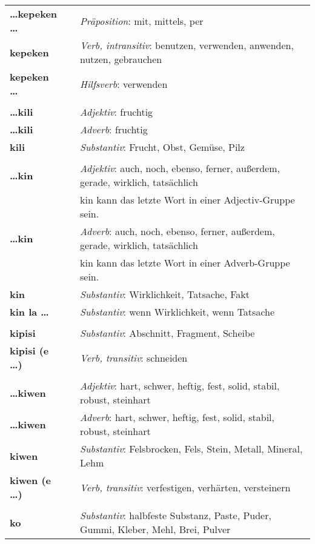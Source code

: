 \begin{supertabular}{p{2,5cm}|ll}
\textbf{\dots kepeken \dots} && \textit{Präposition}: mit, mittels, per \\ 
\textbf{kepeken} && \textit{Verb, intransitiv}: benutzen, verwenden, anwenden, nutzen, gebrauchen \\ 
\textbf{kepeken \dots} && \textit{Hilfsverb}: verwenden \\ 
 && \\ %
\textbf{\dots kili} && \textit{Adjektiv}: fruchtig \\ 
\textbf{\dots kili} && \textit{Adverb}: fruchtig \\ 
\textbf{kili} && \textit{Substantiv}: Frucht, Obst, Gemüse, Pilz \\ 
 && \\ %
\textbf{\dots kin} && \textit{Adjektiv}: auch, noch, ebenso, ferner, außerdem, gerade, wirklich, tatsächlich \\ && kin kann das letzte Wort in einer Adjectiv-Gruppe sein. \\
\textbf{\dots kin} && \textit{Adverb}: auch, noch, ebenso, ferner, außerdem, gerade, wirklich, tatsächlich \\ && kin kann das letzte Wort in einer Adverb-Gruppe sein. \\
\textbf{kin} && \textit{Substantiv}: Wirklichkeit, Tatsache, Fakt  \\ 
\textbf{kin la \dots} && \textit{Substantiv}: wenn Wirklichkeit, wenn Tatsache \\ 
 && \\ %
\textbf{kipisi } && \textit{Substantiv}: Abschnitt, Fragment, Scheibe \\ 
\textbf{kipisi (e \dots)} && \textit{Verb, transitiv}: schneiden \\ 
 && \\ %
\textbf{\dots kiwen} && \textit{Adjektiv}: hart, schwer, heftig, fest, solid, stabil, robust, steinhart \\ 
\textbf{\dots kiwen} && \textit{Adverb}: hart, schwer, heftig, fest, solid, stabil, robust, steinhart \\ 
\textbf{kiwen} && \textit{Substantiv}: Felsbrocken, Fels, Stein, Metall, Mineral, Lehm \\ 
\textbf{kiwen (e \dots)} && \textit{Verb, transitiv}: verfestigen, verhärten, versteinern \\ 
 && \\ %
\textbf{ko} && \textit{Substantiv}: halbfeste Substanz, Paste, Puder, Gummi, Kleber, Mehl, Brei, Pulver \\ 

\end{supertabular}
